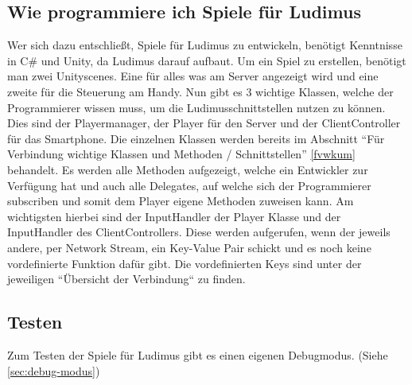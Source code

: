 \subsection{Wie programmiere ich Spiele für Ludimus}
Wer sich dazu entschließt, Spiele für Ludimus zu entwickeln, benötigt Kenntnisse in C\# und Unity, da Ludimus darauf aufbaut. Um ein Spiel zu erstellen, benötigt man zwei Unityscenes. Eine für alles was am Server angezeigt wird und eine zweite für die Steuerung am Handy. Nun gibt es 3 wichtige Klassen, welche der Programmierer wissen muss, um die Ludimusschnittstellen nutzen zu können. Dies sind der Playermanager, der Player für den Server und der ClientController für das Smartphone.
Die einzelnen Klassen werden bereits im Abschnitt “Für Verbindung wichtige Klassen und Methoden / Schnittstellen” \ref{fvwkum} behandelt. Es werden alle Methoden aufgezeigt, welche ein Entwickler zur Verfügung hat und auch alle Delegates, auf welche sich der Programmierer subscriben und somit dem Player eigene Methoden zuweisen kann. Am wichtigsten hierbei sind der InputHandler der Player Klasse und der InputHandler des ClientControllers. Diese werden aufgerufen, wenn der jeweils andere, per Network Stream, ein Key-Value Pair schickt und es noch keine vordefinierte Funktion dafür gibt. Die vordefinierten Keys sind unter der jeweiligen “Übersicht der Verbindung“ zu finden.
\subsection{Testen}
Zum Testen der Spiele für Ludimus gibt es einen eigenen Debugmodus. (Siehe \ref{sec:debug-modus})

